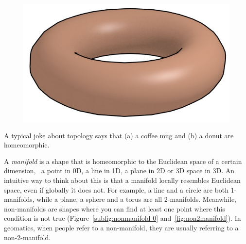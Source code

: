 \begin{marginfigure}
\begin{subfigure}[b]{\linewidth}
\includegraphics[width=\linewidth]{figs/donut}
\caption{}%
\label{subfig:donut}
\end{subfigure}
\caption{A typical joke about topology says that (a) a coffee mug and (b) a donut are homeomorphic.}%
\label{fig:homeomorphism}
\end{marginfigure}

A \emph{manifold} is a shape that is homeomorphic to the Euclidean space of a certain dimension, \ie\ a point in 0D, a line in 1D, a plane in 2D or 3D space in 3D.
An intuitive way to think about this is that a manifold locally resembles Euclidean space, even if globally it does not.
For example, a line and a circle are both 1-manifolds, while a plane, a sphere and a torus are all 2-manifolds.
Meanwhile, non-manifolds are shapes where you can find at least one point where this condition is not true (Figure~\ref{subfig:nonmanifold-0} and~\ref{fig:non2manifold}).
In geomatics, when people refer to a non-manifold, they are usually referring to a non-2-manifold.

